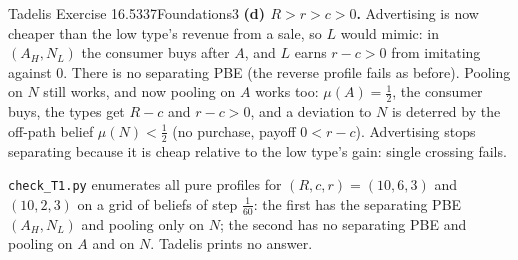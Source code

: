 \begin{exsol}{Tadelis Exercise 16.5}{337}{Foundations}{3}
\textbf{(d) $R > r > c > 0$.} Advertising is now cheaper than the low type's revenue from a sale,
so $L$ would mimic: in $(A_H, N_L)$ the consumer buys after $A$, and $L$ earns $r - c > 0$ from
imitating against $0$. There is no separating PBE (the reverse profile fails as before). Pooling on
$N$ still works, and now pooling on $A$ works too: $\mu(A) = \frac12$, the consumer buys, the types
get $R - c$ and $r - c > 0$, and a deviation to $N$ is deterred by the off-path belief
$\mu(N) < \frac12$ (no purchase, payoff $0 < r - c$). Advertising stops separating because it is
cheap relative to the low type's gain: single crossing fails.

\verify \texttt{check\_T1.py} enumerates all pure profiles for $(R, c, r) = (10, 6, 3)$ and
$(10, 2, 3)$ on a grid of beliefs of step $\frac1{60}$: the first has the separating PBE $(A_H, N_L)$ and
pooling only on $N$; the second has no separating PBE and pooling on $A$ and on $N$. Tadelis prints
no answer.

\end{exsol}
